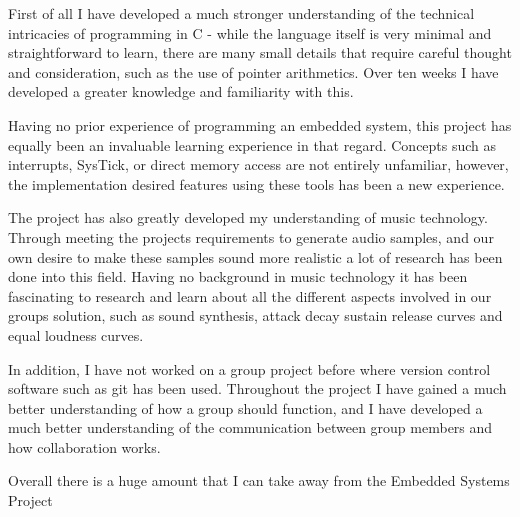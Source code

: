 First of all I have developed a much stronger understanding of the technical 
intricacies of programming in C - while the language itself is very minimal and 
straightforward to learn, there are many small details that require careful 
thought and consideration, such as the use of pointer arithmetics. Over ten weeks 
I have developed a greater knowledge and familiarity with this. 

Having no prior experience of programming an embedded system, this project has 
equally been an invaluable learning experience in that regard. 
Concepts such as interrupts, SysTick, or direct memory access are not entirely 
unfamiliar, however, the implementation desired features using these tools has 
been a new experience.

The project has also greatly developed my understanding of music technology. 
Through meeting the projects requirements to generate audio samples, and our own 
desire to make these samples sound more realistic a lot of research has been done 
into this field. 
Having no background in music technology it has been fascinating to research and 
learn about all the different aspects involved in our groups solution, such as 
sound synthesis, attack decay sustain release curves and equal loudness curves.

In addition, I have not worked on a group project before where version control 
software such as git has been used. Throughout the project I have gained a much 
better understanding of how a group should function, and I have developed a much 
better understanding of the communication between group members and how 
collaboration works. 

Overall there is a huge amount that I can take away from the Embedded Systems 
Project 
